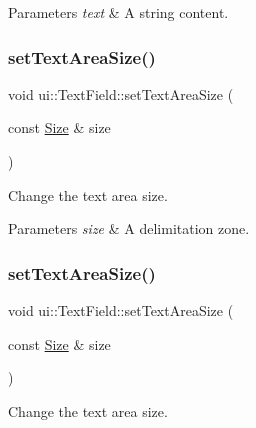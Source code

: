 \begin{DoxyParams}{Parameters}
{\em text} & A string content. \\
\hline
\end{DoxyParams}
\mbox{\label{classui_1_1TextField_aef44e7dff3cdd16328b4d2101b9b6dfb}} 
\subsubsection{\texorpdfstring{set\+Text\+Area\+Size()}{setTextAreaSize()}\hspace{0.1cm}{\footnotesize\ttfamily [1/2]}}
{\footnotesize\ttfamily void ui\+::\+Text\+Field\+::set\+Text\+Area\+Size (\begin{DoxyParamCaption}\item[{const \hyperlink{classSize}{Size} \&}]{size }\end{DoxyParamCaption})}



Change the text area size. 


\begin{DoxyParams}{Parameters}
{\em size} & A delimitation zone. \\
\hline
\end{DoxyParams}
\mbox{\label{classui_1_1TextField_aef44e7dff3cdd16328b4d2101b9b6dfb}} 
\subsubsection{\texorpdfstring{set\+Text\+Area\+Size()}{setTextAreaSize()}\hspace{0.1cm}{\footnotesize\ttfamily [2/2]}}
{\footnotesize\ttfamily void ui\+::\+Text\+Field\+::set\+Text\+Area\+Size (\begin{DoxyParamCaption}\item[{const \hyperlink{classSize}{Size} \&}]{size }\end{DoxyParamCaption})}



Change the text area size. 


